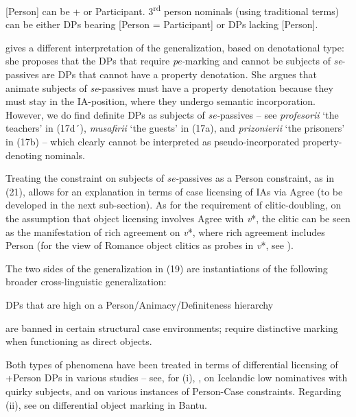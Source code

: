 \documentclass[output=paper]{langsci/langscibook}
\begin{document}
[Person] can be + or \textminus{}Participant. 3\textsuperscript{rd} person nominals (using traditional terms) can be either DPs bearing [Person = \textminus{}Participant] or DPs lacking [Person].

\citet{Cornilescu1998} gives a different interpretation of the generalization, based on denotational type: she proposes that the DPs that require \textit{pe-}marking and cannot be subjects of \textit{se}{}-passives are DPs that cannot have a property denotation. She argues that animate subjects of \textit{se}{}-passives must have a property denotation because they must stay in the IA-position, where they undergo semantic incorporation. However, we do find definite DPs as subjects of \textit{se-}passives – see \textit{profesorii} ‘the teachers’ in (17d´), \textit{musafirii} ‘the guests’ in (17a), and \textit{prizonierii} ‘the prisoners’ in (17b) – which clearly cannot be interpreted as pseudo-incorporated property-denoting nominals.

Treating the constraint on subjects of \textit{se-}passives as a Person constraint, as in (21), allows for an explanation in terms of case licensing of IAs via Agree (to be developed in the next sub-section). As for the requirement of clitic-doubling, on the assumption that object licensing involves Agree with \textit{v}*, the clitic can be seen as the manifestation of rich agreement on \textit{v}*, where rich agreement includes Person (for the view of Romance object clitics as probes in \textit{v}*, see \citealt{Roberts2010}).

The two sides of the generalization in (19) are instantiations of the following broader cross-linguistic generalization:

\ea%
    DPs that are high on a Person\slash Animacy/Definiteness hierarchy\label{ex:giurgea:22}\\
        \begin{xlisti}
        \ex are banned in certain structural case environments;
        \ex require distinctive marking when functioning as direct objects.
        \end{xlisti}
\z

Both types of phenomena have been treated in terms of differential licensing of +Person DPs in various studies – see, for (i), \citet{Sigurðsson2004,Sigurðsson2011,Sigurðsson2012,Sigurðsson2008}, on Icelandic low nominatives with quirky subjects, and \citet{Rezac2011} on various instances of Person-Case constraints. Regarding (ii), see \citet{VanderWal2015} on differential object marking in Bantu.
\end{document}
